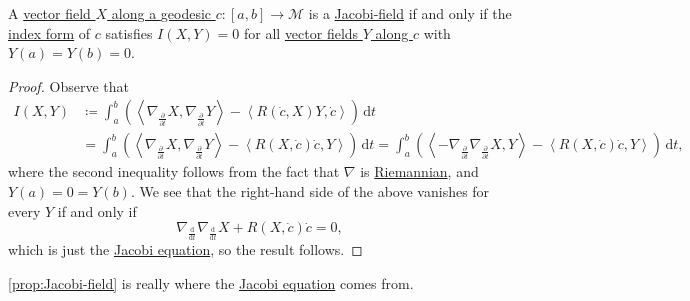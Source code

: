 \begin{proposition}\label{prop:Jacobi-field}
	A \hyperref[def:vector-field-along-curve]{vector field \(X\) along a \hyperref[def:geodesic]{geodesic} \(c\colon [a, b] \to \mathcal{M} \)} is a \hyperref[def:Jacobi-field]{Jacobi-field} if and only if the \hyperref[def:index-form]{index form} of \(c\) satisfies \(I(X, Y) = 0\) for all \hyperref[def:vector-field-along-curve]{vector fields \(Y\) along \(c\)} with \(Y(a) = Y(b) = 0\).
\end{proposition}
\begin{proof}
	Observe that
	\[
		\begin{split}
			I(X, Y)
			&\coloneqq \int_{a}^{b} \left( \left\langle \nabla _{\frac{\partial }{\partial t} } X, \nabla _{\frac{\partial }{\partial t} } Y \right\rangle - \left\langle R(\dot{c} , X) Y, \dot{c} \right\rangle \right)  \,\mathrm{d}t\\
			&= \int_{a}^{b} \left( \left\langle \nabla _{\frac{\partial }{\partial t} } X, \nabla _{\frac{\partial }{\partial t} } Y \right\rangle - \left\langle R(X, \dot{c}) \dot{c}, Y \right\rangle \right)  \,\mathrm{d}t
			= \int_{a}^{b} \left( \left\langle -\nabla _{\frac{\partial }{\partial t} } \nabla _{\frac{\partial }{\partial t} } X, Y \right\rangle - \left\langle R(X, \dot{c}) \dot{c}, Y \right\rangle \right)  \,\mathrm{d}t,
		\end{split}
	\]
	where the second inequality follows from the fact that \(\nabla \) is \hyperref[def:Riemannian]{Riemannian}, and \(Y(a) = 0 = Y(b)\). We see that the right-hand side of the above vanishes for every \(Y\) if and only if
	\[
		\nabla _{\frac{\mathrm{d}}{\mathrm{d}t} }\nabla _{\frac{\mathrm{d}}{\mathrm{d}t} }X + R(X, \dot{c} )\dot{c} = 0,
	\]
	which is just the \hyperref[eq:Jacobi]{Jacobi equation}, so the result follows.
\end{proof}

\begin{remark}
	\autoref{prop:Jacobi-field} is really where the \hyperref[eq:Jacobi]{Jacobi equation} comes from.
\end{remark}